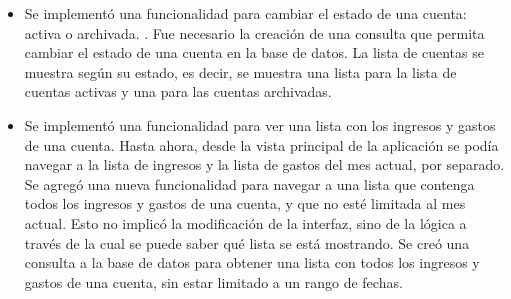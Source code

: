 \begin{itemize}
\item Se implementó una funcionalidad para cambiar el estado de una cuenta: activa o archivada. . Fue necesario la creación de una consulta que permita cambiar el estado de una cuenta en la base de datos. La lista de cuentas se muestra según su estado, es decir, se muestra una lista para la lista de cuentas activas y una para las cuentas archivadas. 
\item Se implementó una funcionalidad para ver una lista con los ingresos y gastos de una cuenta. Hasta ahora, desde la vista principal de la aplicación se podía navegar a la lista de ingresos y la lista de gastos del mes actual, por separado. Se agregó una nueva funcionalidad para navegar a una lista que contenga todos los ingresos y gastos de una cuenta, y que no esté limitada al mes actual. Esto no implicó la modificación de la interfaz, sino de la lógica a través de la cual se puede saber qué lista se está mostrando. Se creó una consulta a la base de datos para obtener una lista con todos los ingresos y gastos de una cuenta, sin estar limitado a un rango de fechas.

\end{itemize}
%
%
%
%
